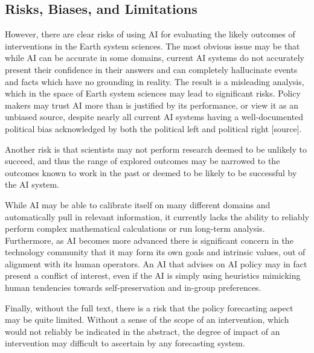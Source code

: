 \documentclass[12pt,a4paper]{article}
\begin{document}
\subsection{Risks, Biases, and Limitations}
However, there are clear risks of using AI for evaluating the likely outcomes of interventions in the Earth system sciences. The most obvious issue may be that while AI can be accurate in some domains, current AI systems do not accurately present their confidence in their answers and can completely hallucinate events and facts which have no grounding in reality. The result is a misleading analysis, which in the space of Earth system sciences may lead to significant risks. Policy makers may trust AI more than is justified by its performance, or view it as an unbiased source, despite nearly all current AI systems having a well-documented political bias acknowledged by both the political left and political right [source]. 

Another risk is that scientists may not perform research deemed to be unlikely to succeed, and thus the range of explored outcomes may be narrowed to the outcomes known to work in the past or deemed to be likely to be successful by the AI system. 

While AI may be able to calibrate itself on many different domains and automatically pull in relevant information, it currently lacks the ability to reliably perform complex mathematical calculations or run long-term analysis. Furthermore, as AI becomes more advanced there is significant concern in the technology community that it may form its own goals and intrinsic values, out of alignment with its human operators. An AI that advises on AI policy may in fact present a conflict of interest, even if the AI is simply using heuristics mimicking human tendencies towards self-preservation and in-group preferences. 

Finally, without the full text, there is a risk that the policy forecasting aspect may be quite limited. Without a sense of the scope of an intervention, which would not reliably be indicated in the abstract, the degree of impact of an intervention may difficult to ascertain by any forecasting system.
\end{document}
